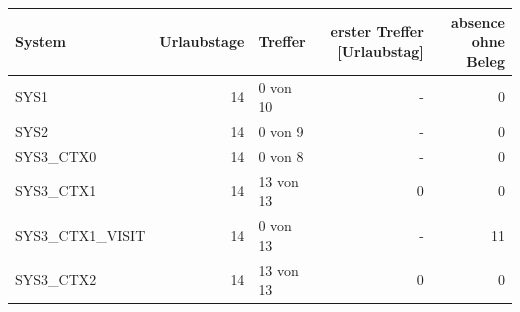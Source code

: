 \begin{tabular}{lrlrr}
\toprule
System & Urlaubstage & Treffer & erster Treffer [Urlaubstag] & absence ohne Beleg \\
\midrule
SYS1 & 14 & 0 von 10 & - & 0 \\
SYS2 & 14 & 0 von 9 & - & 0 \\
SYS3\_CTX0 & 14 & 0 von 8 & - & 0 \\
SYS3\_CTX1 & 14 & 13 von 13 & 0 & 0 \\
SYS3\_CTX1\_VISIT & 14 & 0 von 13 & - & 11 \\
SYS3\_CTX2 & 14 & 13 von 13 & 0 & 0 \\
\bottomrule
\end{tabular}
